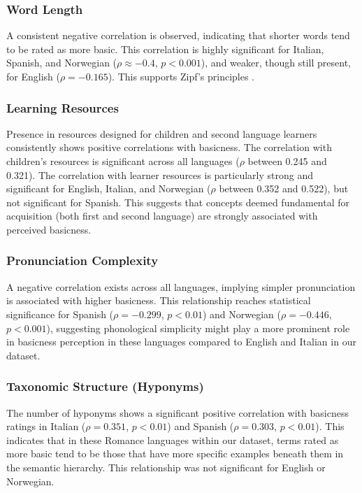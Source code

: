 \documentclass[preprint,12pt,authoryear]{elsarticle}
\begin{document}
\subsubsection{Word Length}
A consistent negative correlation is observed, indicating that shorter words tend to be rated as more basic. This correlation is highly significant for Italian, Spanish, and Norwegian ($\rho \approx -0.4$, $p < 0.001$), and weaker, though still present, for English ($\rho = -0.165$). This supports Zipf's principles \cite{zipf_psycho-biology_1935, zipf_meaning-frequency_1945}.

\subsubsection{Learning Resources}
Presence in resources designed for children and second language learners consistently shows positive correlations with basicness. The correlation with children's resources is significant across all languages ($\rho$ between 0.245 and 0.321). The correlation with learner resources is particularly strong and significant for English, Italian, and Norwegian ($\rho$ between 0.352 and 0.522), but not significant for Spanish. This suggests that concepts deemed fundamental for acquisition (both first and second language) are strongly associated with perceived basicness.

\subsubsection{Pronunciation Complexity}
A negative correlation exists across all languages, implying simpler pronunciation is associated with higher basicness. This relationship reaches statistical significance for Spanish ($\rho = -0.299$, $p < 0.01$) and Norwegian ($\rho = -0.446$, $p < 0.001$), suggesting phonological simplicity might play a more prominent role in basicness perception in these languages compared to English and Italian in our dataset.

\subsubsection{Taxonomic Structure (Hyponyms)}
The number of hyponyms shows a significant positive correlation with basicness ratings in Italian ($\rho = 0.351$, $p < 0.01$) and Spanish ($\rho = 0.303$, $p < 0.01$). This indicates that in these Romance languages within our dataset, terms rated as more basic tend to be those that have more specific examples beneath them in the semantic hierarchy. This relationship was not significant for English or Norwegian.
\end{document}
